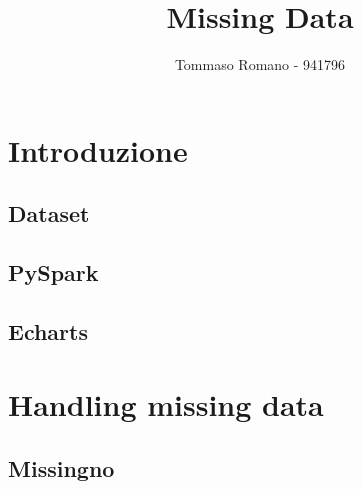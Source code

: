 \documentclass[11pt, oneside]{article}
\title{Missing Data}
\author{Tommaso Romano - 941796}
\begin{document}
\maketitle

\tableofcontents
\pagebreak
\section{Introduzione}

\subsection{Dataset}

\subsection{PySpark}

\subsection{Echarts}

\begin{center}
\end{center}

\section{Handling missing data}

\subsection{Missingno}
\end{document}
